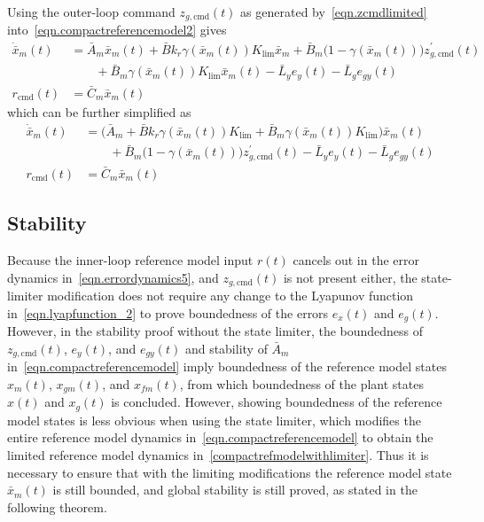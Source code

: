 Using the outer-loop command $z_{g,\text{cmd}}(t)$ as generated by\ \eqref{eqn.zcmdlimited} into\ \eqref{eqn.compactreferencemodel2} gives
\begin{equation}
  \label{compactrefmodelwithlimiter}
  \begin{split}
    \dot{\bar{x}}_{m}(t)
    &=
    \bar{A}_{m}\bar{x}_{m}(t) + \bar{B}k_{r}\gamma(\bar{x}_{m}(t)) K_{\text{lim}}\bar{x}_{m} + \bar{B}_{m}\bigr(1-\gamma(\bar{x}_{m}(t))\bigr)z_{g,\text{cmd}}^{\prime}(t) \\
    & \qquad
    + \bar{B}_{m}\gamma(\bar{x}_{m}(t)) K_{\text{lim}}\bar{x}_{m}(t)-\bar{L}_{y}e_{y}(t) - \bar{L}_{g}e_{gy}(t) \\
    r_{\text{cmd}}(t)
    &=
    \bar{C}_{m}\bar{x}_{m}(t)
  \end{split}
\end{equation}
which can be further simplified as
\begin{equation}
  \label{compactrefmodelwithlimiter2}
  \begin{split}
    \dot{\bar{x}}_{m}(t)
    &=
    \bigr(\bar{A}_{m} + \bar{B}k_{r}\gamma(\bar{x}_{m}(t)) K_{\text{lim}} + \bar{B}_{m}\gamma(\bar{x}_{m}(t)) K_{\text{lim}}\bigr)\bar{x}_{m}(t) \\
    & \qquad
    + \bar{B}_{m}\bigr(1-\gamma(\bar{x}_{m}(t))\bigr)z_{g,\text{cmd}}^{\prime}(t) - \bar{L}_{y}e_{y}(t) - \bar{L}_{g}e_{gy}(t) \\
    r_{\text{cmd}}(t)
    &=
    \bar{C}_{m}\bar{x}_{m}(t)
  \end{split}
\end{equation}

\subsection{Stability}

Because the inner-loop reference model input $r(t)$ cancels out in the error dynamics in\ \eqref{eqn.errordynamics5}, and $z_{g,\text{cmd}}(t)$ is not present either, the state-limiter modification does not require any change to the Lyapunov function in\ \eqref{eqn.lyapfunction_2} to prove boundedness of the errors $e_{x}(t)$ and $e_{g}(t)$.
However, in the stability proof without the state limiter, the boundedness of $z_{g,\text{cmd}}(t)$, $e_{y}(t)$, and $e_{gy}(t)$ and stability of $\bar{A}_{m}$ in\ \eqref{eqn.compactreferencemodel} imply boundedness of the reference model states $x_{m}(t)$, $x_{gm}(t)$, and $x_{fm}(t)$, from which boundedness of the plant states $x(t)$ and $x_{g}(t)$ is concluded.
However, showing boundedness of the reference model states is less obvious when using the state limiter, which modifies the entire reference model dynamics in\ \eqref{eqn.compactreferencemodel} to obtain the limited reference model dynamics in\ \eqref{compactrefmodelwithlimiter}.
Thus it is necessary to ensure that with the limiting modifications the reference model state $\bar{x}_{m}(t)$ is still bounded, and global stability is still proved, as stated in the following theorem.

